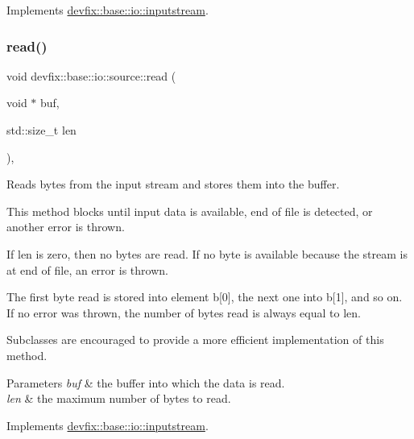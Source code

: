 Implements \hyperlink{structdevfix_1_1base_1_1io_1_1inputstream_a9da6b400424ff476ed0479193c219fa9}{devfix\+::base\+::io\+::inputstream}.

\mbox{\label{structdevfix_1_1base_1_1io_1_1source_a9fbd4d20aa150910ced44018e1b3156a}} 
\subsubsection{\texorpdfstring{read()}{read()}}
{\footnotesize\ttfamily void devfix\+::base\+::io\+::source\+::read (\begin{DoxyParamCaption}\item[{void $\ast$}]{buf,  }\item[{std\+::size\+\_\+t}]{len }\end{DoxyParamCaption})\hspace{0.3cm}{\ttfamily [override]}, {\ttfamily [virtual]}}



Reads bytes from the input stream and stores them into the buffer. 

This method blocks until input data is available, end of file is detected, or another error is thrown.

If len is zero, then no bytes are read. If no byte is available because the stream is at end of file, an error is thrown.

The first byte read is stored into element b\mbox{[}0\mbox{]}, the next one into b\mbox{[}1\mbox{]}, and so on. If no error was thrown, the number of bytes read is always equal to len.

Subclasses are encouraged to provide a more efficient implementation of this method.


\begin{DoxyParams}{Parameters}
{\em buf} & the buffer into which the data is read. \\
\hline
{\em len} & the maximum number of bytes to read. \\
\hline
\end{DoxyParams}


Implements \hyperlink{structdevfix_1_1base_1_1io_1_1inputstream_a17e1a21881ae263650ebdaafaee2e71a}{devfix\+::base\+::io\+::inputstream}.

\mbox{\label{structdevfix_1_1base_1_1io_1_1source_a21cb579307589cbc6f9e02d64c66f4b2}} 
